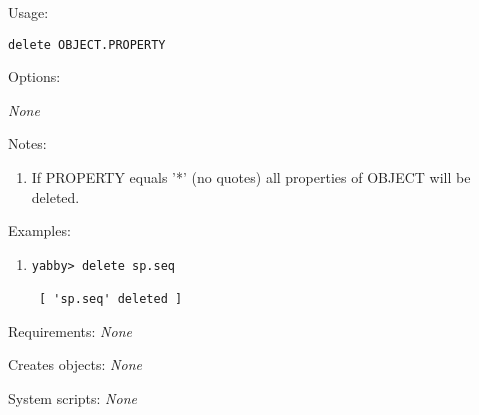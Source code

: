 \begin{description}


\item{Usage:}

{\tt delete OBJECT.PROPERTY}


\item{Options:}
\begin{description}
{\em None}
\end{description}


\item{Notes:}
\begin{enumerate}
\item If PROPERTY equals '*' (no quotes) all properties of OBJECT will
be deleted.
\end{enumerate}


\item{Examples:}
\begin{enumerate}

\item
\begin{verbatim}
yabby> delete sp.seq

 [ 'sp.seq' deleted ]
\end{verbatim}

\end{enumerate}


\item{Requirements:} {\em None}


\item{Creates objects:} {\em None}


\item{System scripts:} {\em None}

\end{description}



\subsection[dump]{  }


